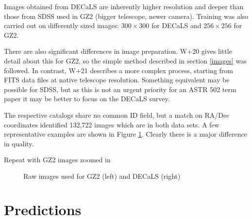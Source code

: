 \documentclass[preprint]{aastex63}
\newcommand{\todo}{\color{red}{TODO}\color{black}\hspace{2mm}}
\begin{document}
Images obtained from DECaLS are inherently higher resolution and deeper than those from SDSS used in GZ2 (bigger telescope, newer camera). Training was also carried out on differently sized images: $300 \times 300$ for DECaLS and $256 \times256$ for GZ2.

There are also significant differences in image preparation. W+20 gives little detail about this for GZ2, so the simple method described in section \ref{images} was followed.  In contrast, W+21 describes a more complex process, starting from FITS data files at native telescope resolution. Something equivalent may be possible for SDSS, but as this is not an urgent priority for an ASTR 502 term paper it may be better to focus on the DECaLS survey.

The respective catalogs share no common ID field, but a match on RA/Dec coordinates identified 132,722 images which are in both data sets. A few representative examples are shown in Figure \ref{fig:images}. Clearly there is a major difference in quality.

\todo Repeat with GZ2 images zoomed in

\begin{figure}
	\caption{Raw images used for GZ2 (left) and DECaLS (right) \label{fig:images}}
\end{figure}


\section{Predictions}

\todo

{}

\end{document}
